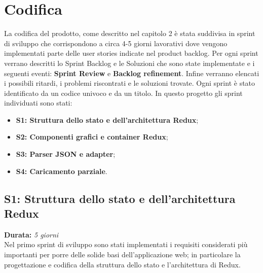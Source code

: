 
\chapter{Codifica}
\label{cap:codifica}

La codifica del prodotto, come descritto nel capitolo 2 è stata suddivisa in sprint di sviluppo che corrispondono a circa 4-5 giorni lavorativi dove vengono implementati parte delle user stories indicate nel product backlog. Per ogni sprint verrano descritti lo Sprint Backlog e le Soluzioni che sono state implementate e i seguenti eventi: \textbf{Sprint Review} e \textbf{Backlog refinement}.
Infine verranno elencati i possibili ritardi, i problemi riscontrati e le soluzioni trovate. Ogni sprint è stato identificato da un codice univoco e da un titolo. In questo progetto gli sprint individuati sono stati:
\begin{itemize}
	\item \textbf{S1: Struttura dello stato e dell'architettura Redux};
	\item \textbf{S2: Componenti grafici e container Redux};
	\item \textbf{S3: Parser JSON e adapter};
	\item \textbf{S4: Caricamento parziale}.
\end{itemize}


\section{S1: Struttura dello stato e dell'architettura Redux}
\textbf{Durata:} \textit{5 giorni} \\
Nel primo sprint di sviluppo sono stati implementati i requisiti considerati più importanti per porre delle solide basi dell'applicazione web; in particolare la progettazione e codifica della struttura dello stato e l'architettura di Redux.

